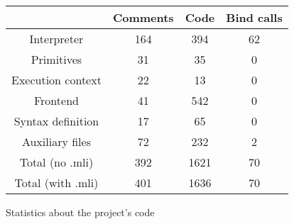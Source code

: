 \documentclass[twocolumn]{article}
\begin{document}
\begin{figure}[hb]
  \begin{tabular}{| c | c | c | c |}
    \hline
    & Comments & Code & Bind calls \\
    \hline
    Interpreter & 164 & 394 & 62 \\
    Primitives & 31 & 35 & 0 \\
    Execution context & 22 & 13 & 0 \\
    Frontend & 41 & 542 & 0 \\
    Syntax definition & 17 & 65 & 0 \\
    Auxiliary files & 72 & 232 & 2 \\
    \hline
    Total (no .mli) & 392 & 1621 & 70 \\
    Total (with .mli) & 401 & 1636 & 70 \\
    \hline
  \end{tabular}

  \centering
  \caption{Statistics about the project's code}
  \label{fig:statistics}
\end{figure}



\end{document}
